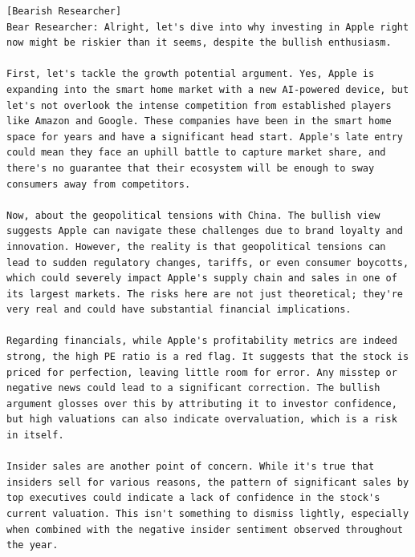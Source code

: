 \begin{tcolorbox}[
    breakable,
    enhanced,
    colback=lightpink!50!white,
    colframe=red!20!gray,
    coltitle=black,
    boxrule=0.5pt,
    arc=0.5mm,
    top=2mm, bottom=2mm, left=2mm, right=2mm,
    fonttitle=\usefont{T1}{ppl}{b}{n},
    title=\model: Researcher Team Bearish Opinion -- Apple (AAPL),
]
\footnotesize
\begin{lstlisting}[style=agentbase]
[Bearish Researcher]
Bear Researcher: Alright, let's dive into why investing in Apple right now might be riskier than it seems, despite the bullish enthusiasm.

First, let's tackle the growth potential argument. Yes, Apple is expanding into the smart home market with a new AI-powered device, but let's not overlook the intense competition from established players like Amazon and Google. These companies have been in the smart home space for years and have a significant head start. Apple's late entry could mean they face an uphill battle to capture market share, and there's no guarantee that their ecosystem will be enough to sway consumers away from competitors.

Now, about the geopolitical tensions with China. The bullish view suggests Apple can navigate these challenges due to brand loyalty and innovation. However, the reality is that geopolitical tensions can lead to sudden regulatory changes, tariffs, or even consumer boycotts, which could severely impact Apple's supply chain and sales in one of its largest markets. The risks here are not just theoretical; they're very real and could have substantial financial implications.

Regarding financials, while Apple's profitability metrics are indeed strong, the high PE ratio is a red flag. It suggests that the stock is priced for perfection, leaving little room for error. Any misstep or negative news could lead to a significant correction. The bullish argument glosses over this by attributing it to investor confidence, but high valuations can also indicate overvaluation, which is a risk in itself.

Insider sales are another point of concern. While it's true that insiders sell for various reasons, the pattern of significant sales by top executives could indicate a lack of confidence in the stock's current valuation. This isn't something to dismiss lightly, especially when combined with the negative insider sentiment observed throughout the year.


\end{lstlisting}
\end{tcolorbox}
